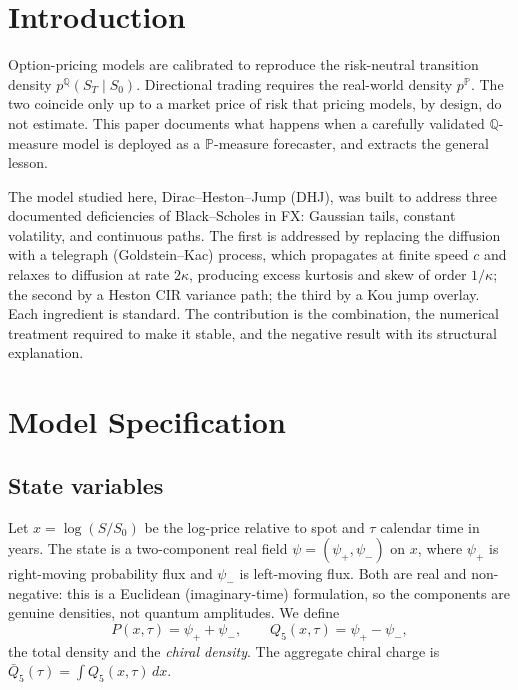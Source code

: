 \documentclass[11pt]{article}
\begin{document}
\vspace{-0.8em}
\section{Introduction}

Option-pricing models are calibrated to reproduce the risk-neutral
transition density $p^{\mathbb{Q}}(S_T \mid S_0)$. Directional trading
requires the real-world density $p^{\mathbb{P}}$. The two coincide only up
to a market price of risk that pricing models, by design, do not estimate.
This paper documents what happens when a carefully validated $\mathbb{Q}$-measure
model is deployed as a $\mathbb{P}$-measure forecaster, and extracts the
general lesson.

The model studied here, Dirac--Heston--Jump (DHJ), was built to address
three documented deficiencies of Black--Scholes in FX: Gaussian tails,
constant volatility, and continuous paths. The first is addressed by
replacing the diffusion with a telegraph (Goldstein--Kac) process, which
propagates at finite speed $c$ and relaxes to diffusion at rate $2\kappa$,
producing excess kurtosis and skew of order $1/\kappa$; the second by a
Heston CIR variance path; the third by a Kou jump overlay. Each ingredient
is standard. The contribution is the combination, the numerical treatment
required to make it stable, and the negative result with its structural
explanation.

\section{Model Specification}
\label{sec:spec}

\subsection{State variables}

Let $x = \log(S/S_0)$ be the log-price relative to spot and $\tau$ calendar
time in years. The state is a two-component real field
$\psi = (\psi_+, \psi_-)$ on $x$, where $\psi_+$ is right-moving probability
flux and $\psi_-$ is left-moving flux. Both are real and non-negative: this
is a Euclidean (imaginary-time) formulation, so the components are genuine
densities, not quantum amplitudes. We define
\begin{equation}
P(x,\tau) = \psi_+ + \psi_-, \qquad
Q_5(x,\tau) = \psi_+ - \psi_-,
\end{equation}
the total density and the \emph{chiral density}. The aggregate chiral charge
is $\bar{Q}_5(\tau) = \int Q_5(x,\tau)\,dx$.
\end{document}
